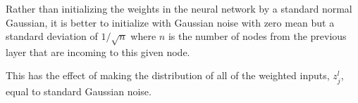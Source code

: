 \documentclass[xetex,mathserif,serif,aspectratio=169]{beamer}
\begin{document}
\begin{frame}[fragile] \frametitle{} \oldB \small

\textbf{}

Rather than initializing the weights in the neural network by a standard normal
Gaussian, it is better to initialize with Gaussian noise with zero mean but a
standard deviation of $1 / \sqrt{n}$ where $n$ is the number of nodes from the
previous layer that are incoming to this given node.

This has the effect of making the distribution of all of the weighted inputs, $z_j^l$,
equal to standard Gaussian noise.

\end{frame}
\end{document}
